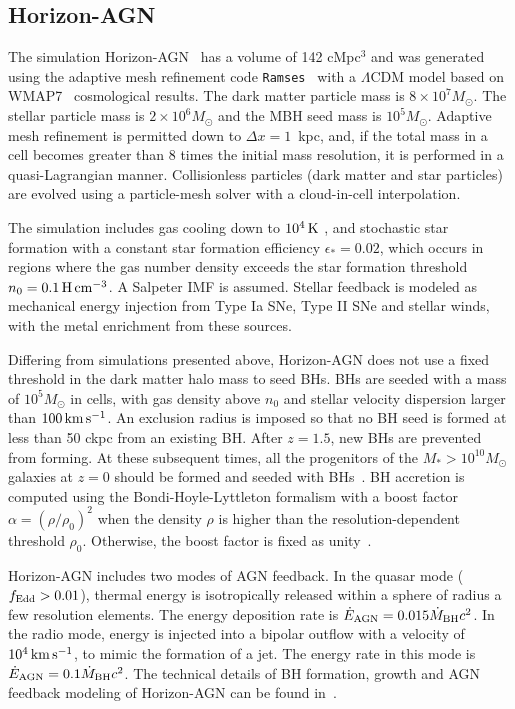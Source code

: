 \documentclass[twocolumn]{aastex631}
\def\smass{{$M_*$}}
\begin{document}
\subsection{Horizon-AGN}\label{subsec:Horizon}
The simulation Horizon-AGN~\citep{2014MNRAS.444.1453D, 2016MNRAS.463.3948D} has a volume of 142 cMpc$^3$ and was generated using the adaptive mesh refinement code {\tt Ramses}~\citep{2002A&A...385..337T} with a $\Lambda$CDM model based on WMAP7~\citep{2011ApJS..192...18K} cosmological results. The dark matter particle mass is $8\times 10^7 M_{\odot}$. The stellar particle mass is $2\times 10^6 M_{\odot}$ and the MBH seed mass is $10^5 M_{\odot}$. Adaptive mesh refinement is permitted down to $\Delta x=1$~kpc, and, if the total mass in a cell becomes greater than 8 times the initial mass resolution, it is performed in a quasi-Lagrangian manner. Collisionless particles (dark matter and star particles) are evolved using a particle-mesh solver with a cloud-in-cell interpolation.

The simulation includes gas cooling down to $10^4\, \rm K$ \citep{sutherland&dopita93}, and stochastic star formation with a constant star formation efficiency $\epsilon_*=0.02$, which occurs in regions where the gas number density exceeds the star formation threshold $n_0 = 0.1\,\rm H\, cm^{-3}$. A Salpeter IMF is assumed. Stellar feedback is modeled as mechanical energy injection from Type Ia SNe, Type II SNe and stellar winds, with the metal enrichment from these sources.

Differing from simulations presented above, Horizon-AGN does not use a fixed threshold in the dark matter halo mass to seed BHs.  BHs are seeded with a mass of $10^5 M_\odot$ in cells, with gas density above $n_0$ and stellar velocity dispersion larger than $100 \,\rm km\,s^{-1}$. An exclusion radius is imposed so that no BH seed is formed at less than 50 ckpc from an existing BH. After $z = 1.5$, new BHs are prevented from forming. At these subsequent times, all the progenitors of the \smass$>10^{10} M_{\odot}$ galaxies at $z = 0$ should be formed and seeded with BHs~\citep{2016MNRAS.460.2979V}.  BH accretion is computed using the Bondi-Hoyle-Lyttleton formalism with a boost factor $\alpha = (\rho/\rho_0)^2$ when the density $\rho$ is higher than the resolution-dependent threshold $\rho_0$. Otherwise, the boost factor is fixed as unity~\citep{2009MNRAS.398...53B}.

Horizon-AGN includes two modes of AGN feedback. In the quasar mode ($f_{\rm Edd}>0.01$), thermal energy is isotropically released within a sphere of radius a few resolution elements. The energy deposition rate is $\dot{E}_{\rm AGN} = 0.015 \dot{M}_{\rm BH} c^2$. In the radio mode, energy is injected into a bipolar  outflow  with  a  velocity  of  $10^4\,\rm km\,s^{-1}$, to  mimic the  formation  of  a  jet.  The  energy  rate  in  this  mode is $\dot{E}_{\rm AGN} = 0.1 \dot{M}_{\rm BH} c^2$.  The  technical  details  of  BH  formation,  growth  and AGN  feedback  modeling  of  Horizon-AGN  can be found in~\citet{2012MNRAS.420.2662D}.
\end{document}
